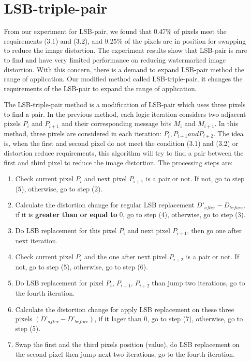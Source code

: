 \section{\label{sec:level1}LSB-triple-pair}

From our experiment for LSB-pair, we found that 0.47\% of pixels meet the requirements (3.1) and (3.2), and 0.25\% of the pixels are in position for swapping to reduce the image distortion. The experiment results show that LSB-pair is rare to find and have very limited performance on reducing watermarked image distortion. With this concern, there is a demand to expand LSB-pair method the range of application. Our modified method called LSB-triple-pair, it changes the requirements of the LSB-pair to expand the range of application.

The LSB-triple-pair method is a modification of LSB-pair which uses three pixels to find a pair. In the previous method, each logic iteration considers two adjacent pixels \(P_{i}\) and \(P_{i+1}\) and their corresponding message bits \(M_{i}\) and \(M_{i+1}\). In this method, three pixels are considered in each iteration: \(P_{i}, P_{i+1} and P_{i+2}\). The idea is, when the first and second pixel do not meet the condition (3.1) and (3.2) or distortion reduce requirements, this algorithm will try to find a pair between the first and third pixel to reduce the image distortion. The processing steps are:

\begin{enumerate}
\item Check current pixel \(P_{i}\) and next pixel \(P_{i+1}\) is a pair or not. If not, go to step (5), otherwise, go to step (2).
\item Calculate the distortion change for regular LSB replacement \(D'_{after} - D_{before}\), if it is \textbf{greater than or equal to} 0, go to step (4), otherwise, go to step (3).
\item Do LSB replacement for this pixel \(P_{i}\) and next pixel \(P_{i+1}\), then go one after next iteration.
\item Check current pixel \(P_{i}\) and the one after next pixel \(P_{i+2}\) is a pair or not. If not, go to step (5), otherwise, go to step (6).
\item Do LSB replacement for pixel \(P_{i}\), \(P_{i+1}\), \(P_{i+2}\) than jump two iterations, go to the fourth iteration.
\item Calculate the distortion change for apply LSB replacement on these three pixels \((D’_{after} - D’_{before})\), if it lager than 0, go to step (7), otherwise, go to step (5).
\item Swap the first and the third pixels position (value), do LSB replacement on the second pixel then jump next two iterations, go to the fourth iteration.
\end{enumerate}

